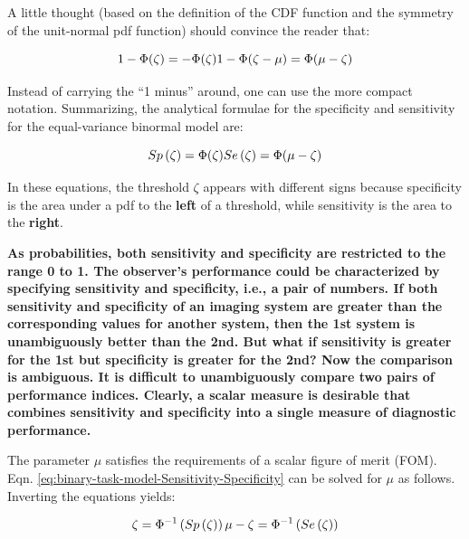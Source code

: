 \documentclass[
]{book}
\begin{document}
A little thought (based on the definition of the CDF function and the symmetry of the unit-normal pdf function) should convince the reader that:

\begin{equation} 
1-\Phi(\zeta)=-\Phi(\zeta)\\
1-\Phi(\zeta-\mu)=\Phi(\mu-\zeta)
\label{eq:binary-task-model-Sensitivity2}
\end{equation}

Instead of carrying the ``1 minus'' around, one can use the more compact notation. Summarizing, the analytical formulae for the specificity and sensitivity for the equal-variance binormal model are:

\begin{equation} 
Sp\left ( \zeta \right ) = \Phi(\zeta)\\
Se\left ( \zeta \right ) = \Phi(\mu-\zeta)
\label{eq:binary-task-model-Sensitivity-Specificity}
\end{equation}

In these equations, the threshold \(\zeta\) appears with different signs because specificity is the area under a pdf to the \textbf{left} of a threshold, while sensitivity is the area to the \textbf{right}.

\textbf{As probabilities, both sensitivity and specificity are restricted to the range 0 to 1. The observer's performance could be characterized by specifying sensitivity and specificity, i.e., a pair of numbers. If both sensitivity and specificity of an imaging system are greater than the corresponding values for another system, then the 1st system is unambiguously better than the 2nd. But what if sensitivity is greater for the 1st but specificity is greater for the 2nd? Now the comparison is ambiguous. It is difficult to unambiguously compare two pairs of performance indices. Clearly, a scalar measure is desirable that combines sensitivity and specificity into a single measure of diagnostic performance.}

The parameter \(\mu\) satisfies the requirements of a scalar figure of merit (FOM). Eqn. \eqref{eq:binary-task-model-Sensitivity-Specificity} can be solved for \(\mu\) as follows. Inverting the equations yields:

\begin{equation} 
\zeta =\Phi^{-1} \left (Sp\left ( \zeta \right )  \right )\\
\mu - \zeta = \Phi^{-1} \left (Se\left ( \zeta \right )  \right )
\label{eq:binary-task-model-solve-mu-zeta}
\end{equation}
\end{document}
